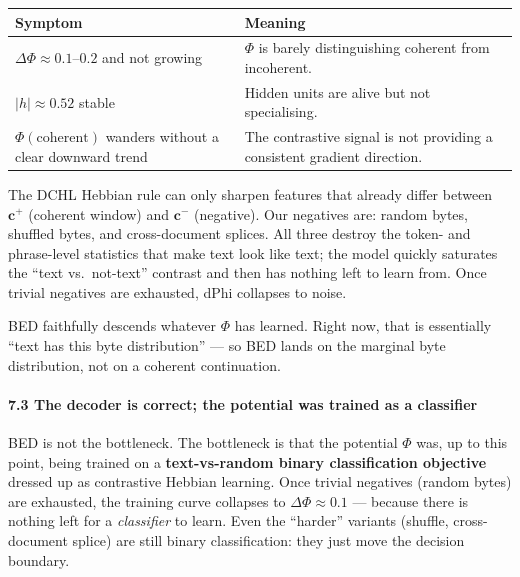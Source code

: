 \documentclass[
  11pt,
  a4paper,
]{article}
\begin{document}
\begin{longtable}[]{@{}
  >{\raggedright\arraybackslash}p{}
  >{\raggedright\arraybackslash}p{}@{}}
\toprule\noalign{}
\begin{minipage}[b]{\linewidth}\raggedright
Symptom
\end{minipage} & \begin{minipage}[b]{\linewidth}\raggedright
Meaning
\end{minipage} \\
\midrule\noalign{}
\endhead
\bottomrule\noalign{}
\endlastfoot
\(\Delta\Phi \approx 0.1\)--\(0.2\) and not growing & \(\Phi\) is barely
distinguishing coherent from incoherent. \\
\(\lvert h \rvert \approx 0.52\) stable & Hidden units are alive but not
specialising. \\
\(\Phi(\text{coherent})\) wanders without a clear downward trend & The
contrastive signal is not providing a consistent gradient direction. \\
\end{longtable}

The DCHL Hebbian rule can only sharpen features that already differ
between \(\mathbf{c}^{+}\) (coherent window) and \(\mathbf{c}^{-}\)
(negative). Our negatives are: random bytes, shuffled bytes, and
cross-document splices. All three destroy the token- and phrase-level
statistics that make text look like text; the model quickly saturates
the ``text vs.~not-text'' contrast and then has nothing left to learn
from. Once trivial negatives are exhausted, dPhi collapses to noise.

BED faithfully descends whatever \(\Phi\) has learned. Right now, that
is essentially ``text has this byte distribution'' --- so BED lands on
the marginal byte distribution, not on a coherent continuation.

\paragraph{7.3 The decoder is correct; the potential was trained as a
classifier}\label{the-decoder-is-correct-the-potential-was-trained-as-a-classifier}

BED is not the bottleneck. The bottleneck is that the potential \(\Phi\)
was, up to this point, being trained on a \textbf{text-vs-random binary
classification objective} dressed up as contrastive Hebbian learning.
Once trivial negatives (random bytes) are exhausted, the training curve
collapses to \(\Delta\Phi \approx 0.1\) --- because there is nothing
left for a \emph{classifier} to learn. Even the ``harder'' variants
(shuffle, cross-document splice) are still binary classification: they
just move the decision boundary.
\end{document}

